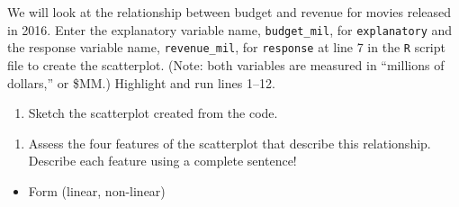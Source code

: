\documentclass[
]{report}
\newenvironment{Shaded}{\begin{snugshade}}{\end{snugshade}}
\newcommand{\AttributeTok}[1]{\textcolor[rgb]{0.77,0.63,0.00}{#1}}
\newcommand{\CommentTok}[1]{\textcolor[rgb]{0.56,0.35,0.01}{\textit{#1}}}
\newcommand{\ConstantTok}[1]{\textcolor[rgb]{0.00,0.00,0.00}{#1}}
\newcommand{\FunctionTok}[1]{\textcolor[rgb]{0.00,0.00,0.00}{#1}}
\newcommand{\NormalTok}[1]{#1}
\newcommand{\SpecialCharTok}[1]{\textcolor[rgb]{0.00,0.00,0.00}{#1}}
\newcommand{\StringTok}[1]{\textcolor[rgb]{0.31,0.60,0.02}{#1}}
\providecommand{\tightlist}{%
  \setlength{\itemsep}{0pt}\setlength{\parskip}{0pt}}
\begin{document}
\vspace{0.4in}

We will look at the relationship between budget and revenue for movies released in 2016. Enter the explanatory variable name, \texttt{budget\_mil}, for \texttt{explanatory} and the response variable name, \texttt{revenue\_mil}, for \texttt{response} at line 7 in the \texttt{R} script file to create the scatterplot. (Note: both variables are measured in ``millions of dollars,'' or \$MM.) Highlight and run lines 1--12.

\begin{Shaded}
\end{Shaded}

\begin{enumerate}
\def\labelenumi{\arabic{enumi}.}
\setcounter{enumi}{2}
\tightlist
\item
  Sketch the scatterplot created from the code.
\end{enumerate}

\vspace{2in}

\begin{enumerate}
\def\labelenumi{\arabic{enumi}.}
\setcounter{enumi}{3}
\tightlist
\item
  Assess the four features of the scatterplot that describe this relationship. Describe each feature using a complete sentence!
\end{enumerate}

\begin{itemize}
\tightlist
\item
  Form (linear, non-linear)
\end{itemize}
\end{document}
